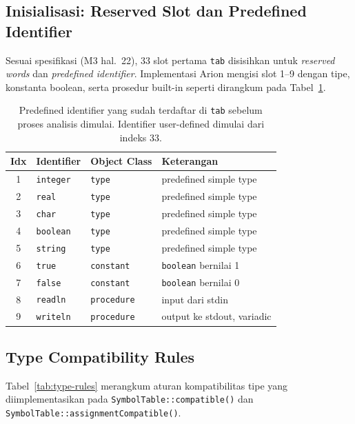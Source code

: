 \documentclass[11pt,a4paper]{article}
\begin{document}
\subsection{Inisialisasi: Reserved Slot dan Predefined Identifier}

Sesuai spesifikasi (M3 hal.~22), 33 slot pertama \texttt{tab} disisihkan untuk
\textit{reserved words} dan \textit{predefined identifier}. Implementasi Arion
mengisi slot 1--9 dengan tipe, konstanta boolean, serta prosedur built-in
seperti dirangkum pada Tabel~\ref{tab:predef}.

\renewcommand{\arraystretch}{1.1}
\begin{table}[H]
\centering
\footnotesize
\begin{tabularx}{\textwidth}{c l l X}
\toprule
\textbf{Idx} & \textbf{Identifier} & \textbf{Object Class} & \textbf{Keterangan} \\
\midrule
1 & \texttt{integer} & \texttt{type}      & predefined simple type \\
2 & \texttt{real}    & \texttt{type}      & predefined simple type \\
3 & \texttt{char}    & \texttt{type}      & predefined simple type \\
4 & \texttt{boolean} & \texttt{type}      & predefined simple type \\
5 & \texttt{string}  & \texttt{type}      & predefined simple type \\
6 & \texttt{true}    & \texttt{constant}  & \texttt{boolean} bernilai 1 \\
7 & \texttt{false}   & \texttt{constant}  & \texttt{boolean} bernilai 0 \\
8 & \texttt{readln}  & \texttt{procedure} & input dari stdin \\
9 & \texttt{writeln} & \texttt{procedure} & output ke stdout, variadic \\
\bottomrule
\end{tabularx}
\caption{Predefined identifier yang sudah terdaftar di \texttt{tab} sebelum
proses analisis dimulai. Identifier user-defined dimulai dari indeks 33.}
\label{tab:predef}
\end{table}
\renewcommand{\arraystretch}{1.05}

\subsection{Type Compatibility Rules}

Tabel~\ref{tab:type-rules} merangkum aturan kompatibilitas tipe yang
diimplementasikan pada \texttt{SymbolTable::compatible()} dan
\texttt{SymbolTable::assignmentCompatible()}.
\end{document}

